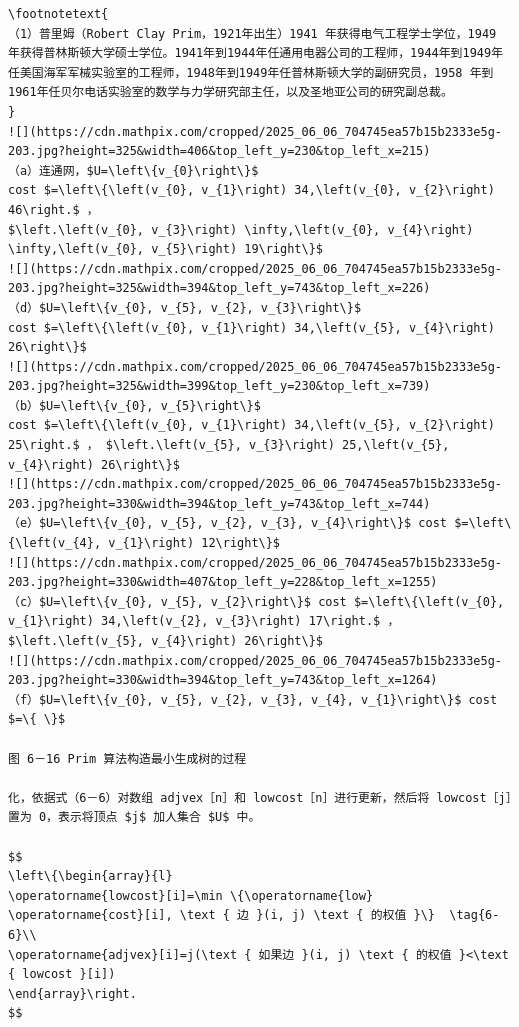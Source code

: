 \documentclass[10pt]{article}
\let\svthefootnote\thefootnote
\newcommand\blfootnotetext[1]{%
  \let\thefootnote\relax\footnote{#1}%
  \addtocounter{footnote}{-1}%
  \let\thefootnote\svthefootnote%
}
\let\svfootnotetext\footnotetext
\renewcommand\footnotetext[2][?]{%
  \if\relax#1\relax%
    \ifnum\value{footnote}=0\blfootnotetext{#2}\else\svfootnotetext{#2}\fi%
  \else%
    \if?#1\ifnum\value{footnote}=0\blfootnotetext{#2}\else\svfootnotetext{#2}\fi%
    \else\svfootnotetext[#1]{#2}\fi%
  \fi
}
\begin{document}
\begin{verbatim}
\footnotetext{
（1）普里姆（Robert Clay Prim，1921年出生）1941 年获得电气工程学士学位，1949 年获得普林斯顿大学硕士学位。1941年到1944年任通用电器公司的工程师，1944年到1949年任美国海军军械实验室的工程师，1948年到1949年任普林斯顿大学的副研究员，1958 年到1961年任贝尔电话实验室的数学与力学研究部主任，以及圣地亚公司的研究副总裁。
}
![](https://cdn.mathpix.com/cropped/2025_06_06_704745ea57b15b2333e5g-203.jpg?height=325&width=406&top_left_y=230&top_left_x=215)
（a）连通网，$U=\left\{v_{0}\right\}$
cost $=\left\{\left(v_{0}, v_{1}\right) 34,\left(v_{0}, v_{2}\right) 46\right.$ ，
$\left.\left(v_{0}, v_{3}\right) \infty,\left(v_{0}, v_{4}\right) \infty,\left(v_{0}, v_{5}\right) 19\right\}$
![](https://cdn.mathpix.com/cropped/2025_06_06_704745ea57b15b2333e5g-203.jpg?height=325&width=394&top_left_y=743&top_left_x=226)
（d）$U=\left\{v_{0}, v_{5}, v_{2}, v_{3}\right\}$
cost $=\left\{\left(v_{0}, v_{1}\right) 34,\left(v_{5}, v_{4}\right) 26\right\}$
![](https://cdn.mathpix.com/cropped/2025_06_06_704745ea57b15b2333e5g-203.jpg?height=325&width=399&top_left_y=230&top_left_x=739)
（b）$U=\left\{v_{0}, v_{5}\right\}$
cost $=\left\{\left(v_{0}, v_{1}\right) 34,\left(v_{5}, v_{2}\right) 25\right.$ ， $\left.\left(v_{5}, v_{3}\right) 25,\left(v_{5}, v_{4}\right) 26\right\}$
![](https://cdn.mathpix.com/cropped/2025_06_06_704745ea57b15b2333e5g-203.jpg?height=330&width=394&top_left_y=743&top_left_x=744)
（e）$U=\left\{v_{0}, v_{5}, v_{2}, v_{3}, v_{4}\right\}$ cost $=\left\{\left(v_{4}, v_{1}\right) 12\right\}$
![](https://cdn.mathpix.com/cropped/2025_06_06_704745ea57b15b2333e5g-203.jpg?height=330&width=407&top_left_y=228&top_left_x=1255)
（c）$U=\left\{v_{0}, v_{5}, v_{2}\right\}$ cost $=\left\{\left(v_{0}, v_{1}\right) 34,\left(v_{2}, v_{3}\right) 17\right.$ ， $\left.\left(v_{5}, v_{4}\right) 26\right\}$
![](https://cdn.mathpix.com/cropped/2025_06_06_704745ea57b15b2333e5g-203.jpg?height=330&width=394&top_left_y=743&top_left_x=1264)
（f）$U=\left\{v_{0}, v_{5}, v_{2}, v_{3}, v_{4}, v_{1}\right\}$ cost $=\{ \}$

图 6－16 Prim 算法构造最小生成树的过程

化，依据式（6－6）对数组 adjvex［n］和 lowcost［n］进行更新，然后将 lowcost［j］置为 0，表示将顶点 $j$ 加人集合 $U$ 中。

$$
\left\{\begin{array}{l}
\operatorname{lowcost}[i]=\min \{\operatorname{low} \operatorname{cost}[i], \text { 边 }(i, j) \text { 的权值 }\}  \tag{6-6}\\
\operatorname{adjvex}[i]=j(\text { 如果边 }(i, j) \text { 的权值 }<\text { lowcost }[i])
\end{array}\right.
$$



\end{verbatim}
\end{document}
